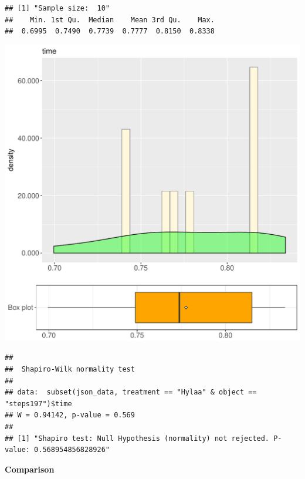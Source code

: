 \documentclass{article}\usepackage[]{graphicx}\usepackage[]{color}
\makeatletter
\def\maxwidth{ %
  \ifdim\Gin@nat@width>\linewidth
    \linewidth
  \else
    \Gin@nat@width
  \fi
}
\newenvironment{kframe}{%
 \def\at@end@of@kframe{}%
 \ifinner\ifhmode%
  \def\at@end@of@kframe{\end{minipage}}%
  \begin{minipage}{\columnwidth}%
 \fi\fi%
 \def\FrameCommand##1{\hskip\@totalleftmargin \hskip-\fboxsep
 \colorbox{shadecolor}{##1}\hskip-\fboxsep
     \hskip-\linewidth \hskip-\@totalleftmargin \hskip\columnwidth}%
 \MakeFramed {\advance\hsize-\width
   \@totalleftmargin\z@ \linewidth\hsize
   \@setminipage}}%
 {\par\unskip\endMakeFramed%
 \at@end@of@kframe}
\newenvironment{knitrout}{}{} %
\makeatother
\begin{document}
\begin{knitrout}
\color{fgcolor}\begin{kframe}
\begin{verbatim}
## [1] "Sample size:  10"
##    Min. 1st Qu.  Median    Mean 3rd Qu.    Max. 
##  0.6995  0.7490  0.7739  0.7777  0.8150  0.8338
\end{verbatim}
\end{kframe}
\includegraphics[width=\maxwidth]{figure/RH3_Hylaa_steps197-1} 
\begin{kframe}\begin{verbatim}
## 
## 	Shapiro-Wilk normality test
## 
## data:  subset(json_data, treatment == "Hylaa" & object == "steps197")$time
## W = 0.94142, p-value = 0.569
## 
## [1] "Shapiro test: Null Hypothesis (normality) not rejected. P-value: 0.568954856828926"
\end{verbatim}
\end{kframe}
\end{knitrout}
  
 \textbf{Comparison}
  
\end{document}
